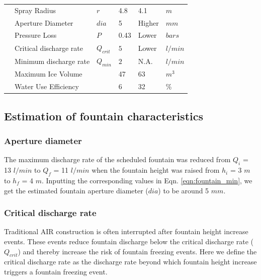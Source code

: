 \documentclass[tc, manuscript]{copernicus}
\begin{document}
\begin{table}
\begin{tabular}{@{}|llllll|@{}}
                           & Spray Radius                    &  $r$            & 4.8           & 4.1           & $m$ \\
		\multicolumn{1}{|l|}{} & Aperture Diameter               &  $dia$          & 5             & Higher        & $mm$ \\
		\multicolumn{1}{|l|}{} & Pressure Loss                   &  $P$            & 0.43          & Lower         & $bars$ \\
		\multicolumn{1}{|l|}{} & Critical discharge rate         &  $Q_{crit}$     & $5$           & Lower         & $l/min$ \\
		\multicolumn{1}{|l|}{} & Minimum discharge rate          &  $Q_{min}$      & $2$           & N.A.          & $l/min$ \\\midrule
		\multicolumn{1}{|l|}{\multirow{2}{*}{\rotatebox[origin=c]{90}{AIR}}}

		                       & Maximum Ice Volume              &                 & 47            & 63            & $m^{3}$ \\
		\multicolumn{1}{|l|}{} & Water Use Efficiency            &                 & 6             & 32            & \% \\\midrule
	\end{tabular}
\end{table}

\subsection{Estimation of fountain characteristics}

\subsubsection{Aperture diameter}

The maximum discharge rate of the scheduled fountain was reduced from $Q_i$ =  13 $l/min$ to $Q_f$ = 11 $l/min$
when the fountain height was raised from  $h_i$ = 3 $m$ to $h_f$ = 4 $m$. Inputting the corresponding values in
Eqn. \ref{eqn:fountain_min}, we get the estimated fountain aperture diameter ($dia$) to be around 5 $mm$. 

\subsubsection{Critical discharge rate}

Traditional AIR construction is often interrupted after fountain height increase events. These events reduce
fountain discharge below the critical discharge rate ($Q_{crit}$) and thereby increase the risk of fountain
freezing events. Here we define the critical discharge rate as the discharge rate beyond which fountain height
increase triggers a fountain freezing event.
\end{document}
